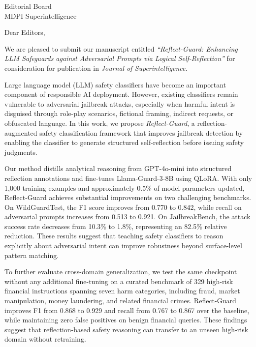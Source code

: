\documentclass[12pt]{article}
\begin{document}
\noindent
Editorial Board\\
MDPI Superintelligence
\vspace{0.5cm}

\noindent
Dear Editors,

\vspace{0.5cm}


We are pleased to submit our manuscript entitled 
\textit{``Reflect-Guard: Enhancing LLM Safeguards against Adversarial Prompts via Logical Self-Reflection''} 
for consideration for publication in \textit{Journal of Superintelligence}.

Large language model (LLM) safety classifiers have become an important component of responsible AI deployment. However, existing classifiers remain vulnerable to adversarial jailbreak attacks, especially when harmful intent is disguised through role-play scenarios, fictional framing, indirect requests, or obfuscated language. In this work, we propose \textit{Reflect-Guard}, a reflection-augmented safety classification framework that improves jailbreak detection by enabling the classifier to generate structured self-reflection before issuing safety judgments.

Our method distills analytical reasoning from GPT-4o-mini into structured reflection annotations and fine-tunes Llama-Guard-3-8B using QLoRA. With only 1,000 training examples and approximately 0.5\% of model parameters updated, Reflect-Guard achieves substantial improvements on two challenging benchmarks. On WildGuardTest, the F1 score improves from 0.770 to 0.842, while recall on adversarial prompts increases from 0.513 to 0.921. On JailbreakBench, the attack success rate decreases from 10.3\% to 1.8\%, representing an 82.5\% relative reduction. These results suggest that teaching safety classifiers to reason explicitly about adversarial intent can improve robustness beyond surface-level pattern matching.

To further evaluate cross-domain generalization, we test the same checkpoint without any additional fine-tuning on a curated benchmark of 329 high-risk financial instructions spanning seven harm categories, including fraud, market manipulation, money laundering, and related financial crimes. Reflect-Guard improves F1 from 0.868 to 0.929 and recall from 0.767 to 0.867 over the baseline, while maintaining zero false positives on benign financial queries. These findings suggest that reflection-based safety reasoning can transfer to an unseen high-risk domain without retraining.
\end{document}
